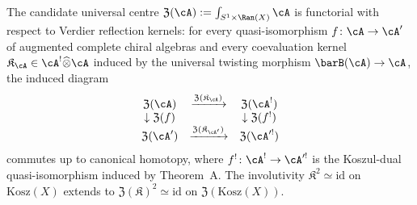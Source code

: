 \begin{proposition}
\label{prop:Z-functoriality-koszul-reflections}
The candidate universal centre $\mathfrak{Z}(\cA) := \int_{S^1 \times \Ran(X)} \cA$
is functorial with respect to Verdier reflection kernels: for every
quasi-isomorphism $f \colon \cA \to \cA'$ of augmented complete chiral
algebras and every coevaluation kernel
$\mathfrak{K}_\cA \in \cA^! \widehat\otimes \cA$ induced by the
universal twisting morphism $\barB(\cA)\to\cA$, the induced
diagram
\[
 \begin{array}{ccc}
 \mathfrak{Z}(\cA) & \xrightarrow{\mathfrak{Z}(\mathfrak{K}_\cA)} & \mathfrak{Z}(\cA^!) \\
 \downarrow{\mathfrak{Z}(f)} & & \downarrow{\mathfrak{Z}(f^!)} \\
 \mathfrak{Z}(\cA') & \xrightarrow{\mathfrak{Z}(\mathfrak{K}_{\cA'})} & \mathfrak{Z}(\cA'^!)
 \end{array}
\]
commutes up to canonical homotopy, where $f^! \colon \cA^! \to \cA'^!$ is
the Koszul-dual quasi-isomorphism induced by Theorem~A.
The involutivity $\mathfrak{K}^2 \simeq \mathrm{id}$ on $\mathrm{Kosz}(X)$
extends to $\mathfrak{Z}(\mathfrak{K})^2 \simeq \mathrm{id}$ on
$\mathfrak{Z}(\mathrm{Kosz}(X))$.
\end{proposition}

